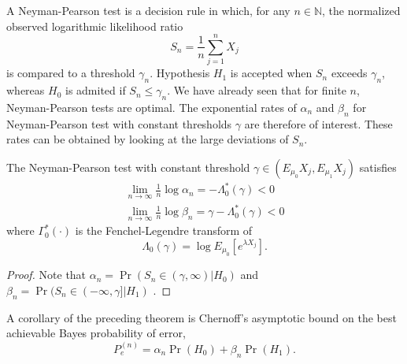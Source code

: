 A Neyman-Pearson test is a decision rule in which, for any $n \in \mathbb{N}$, the normalized observed logarithmic likelihood ratio
\begin{equation*}
S_n = \frac{1}{n} \sum_{j=1}^n X_j
\end{equation*}
is compared to a threshold $\gamma_n$.
Hypothesis $H_1$ is accepted when $S_n$ exceeds $\gamma_n$, whereas $H_0$ is admited if $S_n \leq \gamma_n$.
We have already seen that for finite $n$, Neyman-Pearson tests are optimal.
The exponential rates of $\alpha_n$ and $\beta_n$ for Neyman-Pearson test with constant thresholds $\gamma$ are therefore of interest.
These rates can be obtained by looking at the large deviations of $S_n$.

\begin{theorem} \label{theorem:AsymptoticHypothesisTesting}
The Neyman-Pearson test with constant threshold $\gamma \in (E_{\mu_0} X_j, E_{\mu_1} X_j)$ satisfies
\begin{align*}
\lim_{n \rightarrow \infty} \frac{1}{n} \log \alpha_n = - \Lambda_0^* (\gamma) < 0 \\
\lim_{n \rightarrow \infty} \frac{1}{n} \log \beta_n = \gamma - \Lambda_0^* (\gamma) < 0
\end{align*}
where $\Gamma_0^* (\cdot)$ is the Fenchel-Legendre transform of
\begin{equation*}
\Lambda_0 (\gamma) = \log E_{\mu_0} \left[ e^{\lambda X_j} \right] .
\end{equation*}
\end{theorem}

\begin{proof}
Note that $\alpha_n = \Pr (S_n \in (\gamma, \infty) | H_0)$ and $\beta_n = \Pr (S_n \in (-\infty, \gamma] | H_1)$ .
\end{proof}

A corollary of the preceding theorem is Chernoff's asymptotic bound on the best achievable Bayes probability of error,
\begin{equation*}
P_e^{(n)} = \alpha_n \Pr (H_0) + \beta_n \Pr (H_1) .
\end{equation*}

